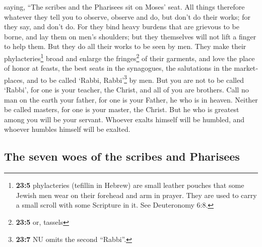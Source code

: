 \begin{paracol}{2}
\begin{otherlanguage}{english}
 saying, ``The scribes and the Pharisees sit on Moses'
seat.  All things therefore whatever they tell you to
observe, observe and do, but don't do their works; for they say, and
don't do.  For they bind heavy burdens that are grievous
to be borne, and lay them on men's shoulders; but they themselves will
not lift a finger to help them.  But they do all their
works to be seen by men. They make their phylacteries\footnote{\textbf{23:5}
  phylacteries (tefillin in Hebrew) are small leather pouches that some
  Jewish men wear on their forehead and arm in prayer. They are used to
  carry a small scroll with some Scripture in it. See Deuteronomy 6:8.}
broad and enlarge the fringes\footnote{\textbf{23:5} or, tassels} of
their garments,  and love the place of honor at feasts,
the best seats in the synagogues,  the salutations in the
marketplaces, and to be called `Rabbi, Rabbi'\footnote{\textbf{23:7} NU
  omits the second ``Rabbi''.} by men.  But you are not to
be called `Rabbi', for one is your teacher, the Christ, and all of you
are brothers.  Call no man on the earth your father, for
one is your Father, he who is in heaven.  Neither be
called masters, for one is your master, the Christ.  But
he who is greatest among you will be your servant. 
Whoever exalts himself will be humbled, and whoever humbles himself will
be exalted.

\hypertarget{the-seven-woes-of-the-scribes-and-pharisees}{%
\subsection{The seven woes of the scribes and
Pharisees}\label{the-seven-woes-of-the-scribes-and-pharisees}}


\end{otherlanguage}
\end{paracol}
